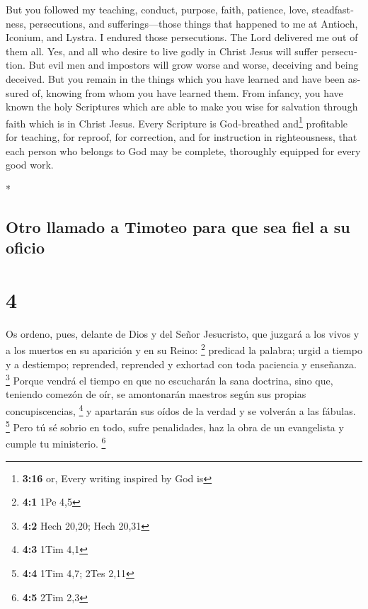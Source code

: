 \begin{paracol}{2}
\begin{otherlanguage}{english}
 But you followed my teaching, conduct, purpose, faith,
patience, love, steadfastness,  persecutions, and
sufferings---those things that happened to me at Antioch, Iconium, and
Lystra. I endured those persecutions. The Lord delivered me out of them
all.  Yes, and all who desire to live godly in Christ
Jesus will suffer persecution.  But evil men and
impostors will grow worse and worse, deceiving and being deceived.
 But you remain in the things which you have learned and
have been assured of, knowing from whom you have learned them.
 From infancy, you have known the holy Scriptures which
are able to make you wise for salvation through faith which is in Christ
Jesus.  Every Scripture is God-breathed and\footnote{\textbf{3:16}
  or, Every writing inspired by God is} profitable for teaching, for
reproof, for correction, and for instruction in righteousness,
 that each person who belongs to God may be complete,
thoroughly equipped for every good work.

\end{otherlanguage}

\switchcolumn[0]*

\hypertarget{otro-llamado-a-timoteo-para-que-sea-fiel-a-su-oficio}{%
\subsection{Otro llamado a Timoteo para que sea fiel a su
oficio}\label{otro-llamado-a-timoteo-para-que-sea-fiel-a-su-oficio}}

\hypertarget{section-6}{%
\section{4}\label{section-6}}

 Os ordeno, pues, delante de Dios y del Señor Jesucristo,
que juzgará a los vivos y a los muertos en su aparición y en su Reino:
\footnote{\textbf{4:1} 1Pe 4,5}  predicad la palabra;
urgid a tiempo y a destiempo; reprended, reprended y exhortad con toda
paciencia y enseñanza. \footnote{\textbf{4:2} Hech 20,20; Hech 20,31}
 Porque vendrá el tiempo en que no escucharán la sana
doctrina, sino que, teniendo comezón de oír, se amontonarán maestros
según sus propias concupiscencias, \footnote{\textbf{4:3} 1Tim 4,1}
 y apartarán sus oídos de la verdad y se volverán a las
fábulas. \footnote{\textbf{4:4} 1Tim 4,7; 2Tes 2,11}  Pero
tú sé sobrio en todo, sufre penalidades, haz la obra de un evangelista y
cumple tu ministerio. \footnote{\textbf{4:5} 2Tim 2,3}


\end{paracol}
